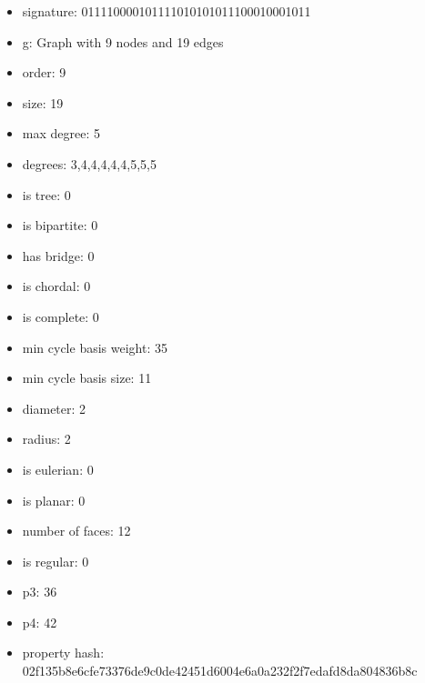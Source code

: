 \newpage
\begin{figure}
\end{figure}
\begin{itemize}
\item signature: 011110000101111010101011100010001011
\item g: Graph with 9 nodes and 19 edges
\item order: 9
\item size: 19
\item max degree: 5
\item degrees: 3,4,4,4,4,4,5,5,5
\item is tree: 0
\item is bipartite: 0
\item has bridge: 0
\item is chordal: 0
\item is complete: 0
\item min cycle basis weight: 35
\item min cycle basis size: 11
\item diameter: 2
\item radius: 2
\item is eulerian: 0
\item is planar: 0
\item number of faces: 12
\item is regular: 0
\item p3: 36
\item p4: 42
\item property hash: 02f135b8e6cfe73376de9c0de42451d6004e6a0a232f2f7edafd8da804836b8c
\end{itemize}

